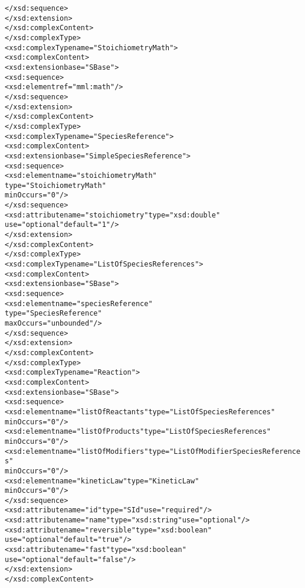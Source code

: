\begin{alltt}
                </xsd:sequence>
            </xsd:extension>
        </xsd:complexContent>
    </xsd:complexType>
    <xsd:complexType name="StoichiometryMath">
        <xsd:complexContent>
            <xsd:extension base="SBase">
                <xsd:sequence>
                    <xsd:element ref="mml:math"/>
                </xsd:sequence>
            </xsd:extension>
        </xsd:complexContent>
    </xsd:complexType>
    <xsd:complexType name="SpeciesReference">
        <xsd:complexContent>
            <xsd:extension base="SimpleSpeciesReference">
                <xsd:sequence>
                    <xsd:element name="stoichiometryMath" 
                                 type="StoichiometryMath" 
                                 minOccurs="0"/>
                </xsd:sequence>
                <xsd:attribute name="stoichiometry" type="xsd:double" 
                               use="optional" default="1"/>
            </xsd:extension>
        </xsd:complexContent>
    </xsd:complexType>
    <xsd:complexType name="ListOfSpeciesReferences">
        <xsd:complexContent>
            <xsd:extension base="SBase">
                <xsd:sequence>
                    <xsd:element name="speciesReference" 
                                 type="SpeciesReference" 
                                 maxOccurs="unbounded"/>
                </xsd:sequence>
            </xsd:extension>
        </xsd:complexContent>
    </xsd:complexType>
    <xsd:complexType name="Reaction">
        <xsd:complexContent>
            <xsd:extension base="SBase">
                <xsd:sequence>
                    <xsd:element name="listOfReactants" type="ListOfSpeciesReferences" 
                                 minOccurs="0"/>
                    <xsd:element name="listOfProducts" type="ListOfSpeciesReferences" 
                                 minOccurs="0"/>
                    <xsd:element name="listOfModifiers" type="ListOfModifierSpeciesReferences" 
                                 minOccurs="0"/>
                    <xsd:element name="kineticLaw" type="KineticLaw" 
                                 minOccurs="0"/>
                </xsd:sequence>
                <xsd:attribute name="id" type="SId" use="required"/>
                <xsd:attribute name="name" type="xsd:string" use="optional"/>
                <xsd:attribute name="reversible" type="xsd:boolean" 
                               use="optional" default="true"/>
                <xsd:attribute name="fast" type="xsd:boolean" 
                               use="optional" default="false"/>
            </xsd:extension>
        </xsd:complexContent>

\end{alltt}
